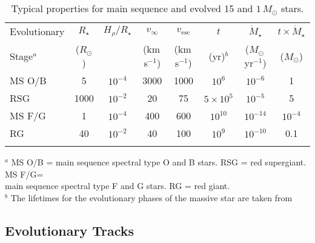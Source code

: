 \begin{table}[!hbt]
\begin{center}
\caption[Properties of main sequence and evolved stars]
{Typical properties for main sequence and evolved 15 and $1\,M_{\odot}$ stars.}
\begin{tabular}{lccccccc}
\hline
\hline
\rule{0pt}{2.5ex}Evolutionary & $R_{\star}$ & $H_{\rho}/R_{\star}$ & $v_{\infty}$ & $v_{\mathrm{esc}}$ &$t$ & $\dot{M}_{\star}$& $t \times \dot{M}_{\star}$\\
 Stage$^{a}$ & ($R_{\odot}$) &  & (km\,s$^{-1}$) & (km\,s$^{-1}$) & (yr)$^{b}$  & ($M_{\odot}$\,yr$^{-1}$)& ($M_{\odot}$) \\
\hline
\rule{0pt}{2.5ex}MS O/B &5 &  $10^{-4}$ & 3000 & 1000&$10^{6}$ & $10^{-6}$&1\\
RSG & 1000 & $10^{-2}$& 20 & 75& $5\times10^{5}$&$10^{-5}$ &5\\ 
\hline
\rule{0pt}{2.5ex}MS F/G & 1 &$10^{-4}$ & 400& 600& $10^{10}$ &$10^{-14}$ &$10^{-4}$\\ 
RG & 40 & $10^{-2}$& 40& 100& $10^{9}$ & $10^{-10}$&0.1\\ 
\hline
\hline
\rule{0pt}{2.0ex}
\end{tabular}
\label{tab:1.1}
\begin{minipage}{19.5cm}
{\footnotesize \vspace{-0.4cm} $^{a}$ MS O/B = main sequence spectral type O and B stars. RSG = red supergiant. MS F/G= \\
main sequence spectral type F and G stars. RG = red giant.\\
\footnotesize  $^{b}$ The lifetimes for the evolutionary phases of the massive star are taken from \\ \cite{stothers_1969}}
\end{minipage}
\end{center}
\end{table}
\vspace{-0.5cm}

\subsection{Evolutionary Tracks}\label{sec:1.5.2}


